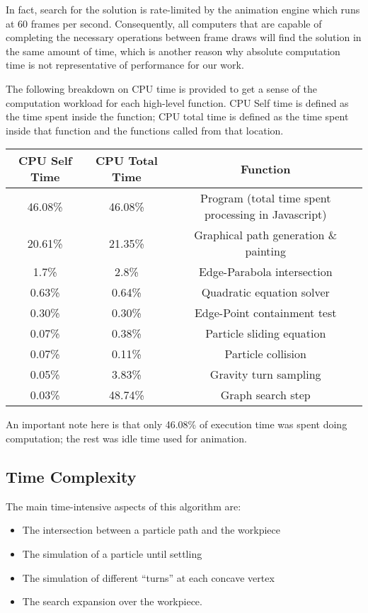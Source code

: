 In fact, search for the solution is rate-limited by the animation engine which runs at 60 frames per second. Consequently, all computers that are capable of completing the necessary operations between frame draws will find the solution in the same amount of time, which is another reason why absolute computation time is not representative of performance for our work.

The following breakdown on CPU time is provided to get a sense of the computation workload for each high-level function. CPU Self time is defined as the time spent inside the function; CPU total time is defined as the time spent inside that function and the functions called from that location.

\begin{table}
\begin{tabular}{|c|c|c|}
\hline
CPU Self Time & CPU Total Time & Function \\ \hline
46.08\% & 46.08\% & Program (total time spent processing in Javascript) \\
20.61\% & 21.35\% & Graphical path generation \& painting \\
1.7\% & 2.8\% & Edge-Parabola intersection \\
0.63\% & 0.64\% & Quadratic equation solver \\
0.30\% & 0.30\% & Edge-Point containment test \\
0.07\% & 0.38\% & Particle sliding equation \\
0.07\% & 0.11\% & Particle collision \\
0.05\% & 3.83\% & Gravity turn sampling \\
0.03\% & 48.74\% & Graph search step \\
\hline
\end{tabular}
\end{table}

An important note here is that only 46.08\% of execution time was spent doing computation; the rest was idle time used for animation.

	\subsection{Time Complexity}

The main time-intensive aspects of this algorithm are:

\begin{itemize}
\item The intersection between a particle path and the workpiece
\item The simulation of a particle until settling
\item The simulation of different ``turns'' at each concave vertex
\item The search expansion over the workpiece.
\end{itemize}

